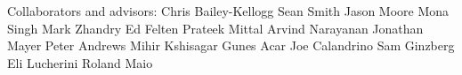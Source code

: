 Collaborators and advisors:
Chris Bailey-Kellogg
Sean Smith
Jason Moore
Mona Singh
Mark Zhandry
Ed Felten
Prateek Mittal
Arvind Narayanan
Jonathan Mayer
Peter Andrews
Mihir Kshisagar
Gunes Acar
Joe Calandrino
Sam Ginzberg
Eli Lucherini
Roland Maio